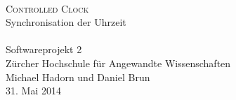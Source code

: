 
\begin{titlepage}
 	\mbox{}\vspace{5\baselineskip}\\
 	\sffamily\huge
 	\centering
 	\textsc{Controlled Clock} \\[2ex]
    Synchronisation der Uhrzeit
    \rmfamily\Large
    \vspace{1\baselineskip}\\
    \mbox{}
    \vspace{3\baselineskip}\\
 	\rmfamily\Large
 	Softwareprojekt 2 \\ Zürcher Hochschule für Angewandte Wissenschaften
 	\vspace{2\baselineskip}\\
 	\rmfamily\Large
 	Michael Hadorn und Daniel Brun
 	\vspace{1\baselineskip}\\
 	31. Mai 2014
\end{titlepage}